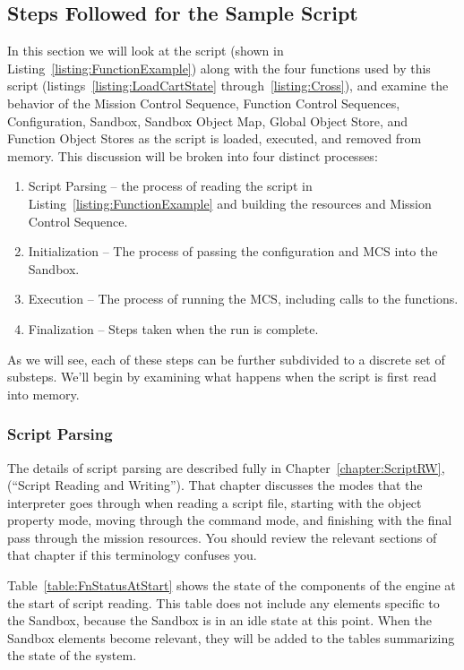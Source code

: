 \subsection{Steps Followed for the Sample Script}
In this section we will look at the script (shown in Listing~\ref{listing:FunctionExample}) along
with the four functions used by this script (listings~\ref{listing:LoadCartState}
through~\ref{listing:Cross}), and examine the behavior of the Mission Control Sequence, Function
Control Sequences, Configuration, Sandbox, Sandbox Object Map, Global Object Store, and Function
Object Stores as the script is loaded, executed, and removed from memory.  This discussion will be
broken into four distinct processes:

\begin{enumerate}
\item Script Parsing -- the process of reading the script in Listing~\ref{listing:FunctionExample}
and building the resources and Mission Control Sequence.
\item Initialization -- The process of passing the configuration and MCS into the Sandbox.
\item Execution -- The process of running the MCS, including calls to the functions.
\item Finalization -- Steps taken when the run is complete.
\end{enumerate}

As we will see, each of these steps can be further subdivided to a discrete set of substeps.  We'll
begin by examining what happens when the script is first read into memory.

\subsubsection[Script Parsing]{Script Parsing}
The details of script parsing are described fully in Chapter~\ref{chapter:ScriptRW},
(``Script Reading and Writing'').  That chapter discusses the modes that the interpreter goes
through when reading a script file, starting with the object property mode, moving through the
command mode, and finishing with the final pass through the mission resources.  You should review
the relevant sections of that chapter if this terminology confuses you.

Table~\ref{table:FnStatusAtStart} shows the state of the components of the engine at the start of
script reading.  This table does not include any elements specific to the Sandbox, because the
Sandbox is in an idle state at this point.  When the Sandbox elements become relevant, they will be
added to the tables summarizing the state of the system.

